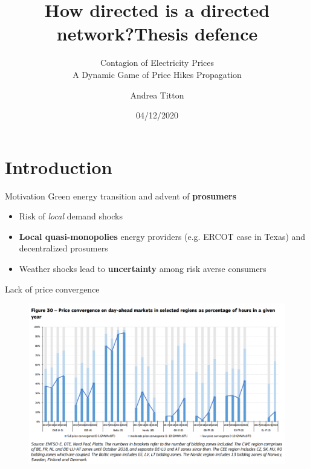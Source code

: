 \documentclass{beamer}
\title{How directed is a directed network?}
\author{Andrea Titton}
\title{Thesis defence}
\subtitle{Contagion of Electricity Prices \\ A Dynamic Game of Price Hikes Propagation}
\institute{Tinbergen Institute}
\date{04/12/2020}
\begin{document}

\frame{\titlepage}

\begin{frame}
    \tableofcontents
\end{frame}

\section{Introduction}

\begin{frame}{Motivation}
    Green energy transition and advent of \textbf{prosumers}
    \vspace{2em}
    \begin{itemize} \setlength\itemsep{1.5em}
              \pause \item Risk of \textit{local} demand shocks
              \pause \item \textbf{Local quasi-monopolies} energy providers (e.g. ERCOT case in Texas) and decentralized prosumers
              \pause \item Weather shocks lead to \textbf{uncertainty} among risk averse consumers
    \end{itemize}
\end{frame}

\begin{frame}{Lack of price convergence}
    \begin{figure}
        \includegraphics[height = 0.7\textheight]{figures/convergence.PNG}
        \caption{\cite{Report2019}}
    \end{figure}
\end{frame}
\end{document}
